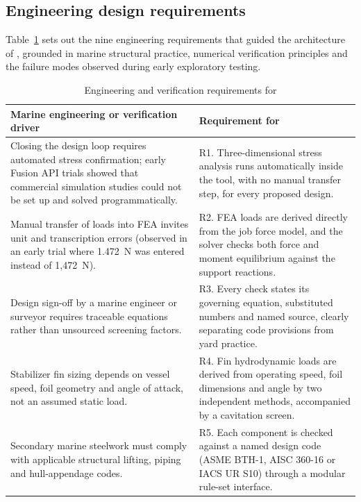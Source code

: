 \subsection{Engineering design requirements}
\label{sec:requirements}

Table~\ref{tab:requirements} sets out the nine engineering requirements that
guided the architecture of \NEMO{}, grounded in marine structural practice,
numerical verification principles \cite{asmeVV10} and the failure modes
observed during early exploratory testing.

\begin{table}[H]
\centering
\caption{Engineering and verification requirements for \NEMO{}}
\label{tab:requirements}
\small
\begin{tabularx}{\textwidth}{>{\raggedright\arraybackslash}p{}>{\raggedright\arraybackslash}X}
\toprule
\textbf{Marine engineering or verification driver} & \textbf{Requirement for \NEMO{}}\\
\midrule
Closing the design loop requires automated stress confirmation; early Fusion API trials showed that commercial simulation studies could not be set up and solved programmatically. &
R1. Three-dimensional stress analysis runs automatically inside the tool, with no manual transfer step, for every proposed design.\\
Manual transfer of loads into FEA invites unit and transcription errors (observed in an early trial where 1.472~N was entered instead of 1,472~N). &
R2. FEA loads are derived directly from the job force model, and the solver checks both force and moment equilibrium against the support reactions.\\
Design sign-off by a marine engineer or surveyor requires traceable equations rather than unsourced screening factors. &
R3. Every check states its governing equation, substituted numbers and named source, clearly separating code provisions from yard practice.\\
Stabilizer fin sizing depends on vessel speed, foil geometry and angle of attack, not an assumed static load. &
R4. Fin hydrodynamic loads are derived from operating speed, foil dimensions and angle by two independent methods, accompanied by a cavitation screen.\\
Secondary marine steelwork must comply with applicable structural lifting, piping and hull-appendage codes. &
R5. Each component is checked against a named design code (ASME BTH-1, AISC 360-16 or IACS UR S10) through a modular rule-set interface.\\

\end{tabularx}
\end{table}
